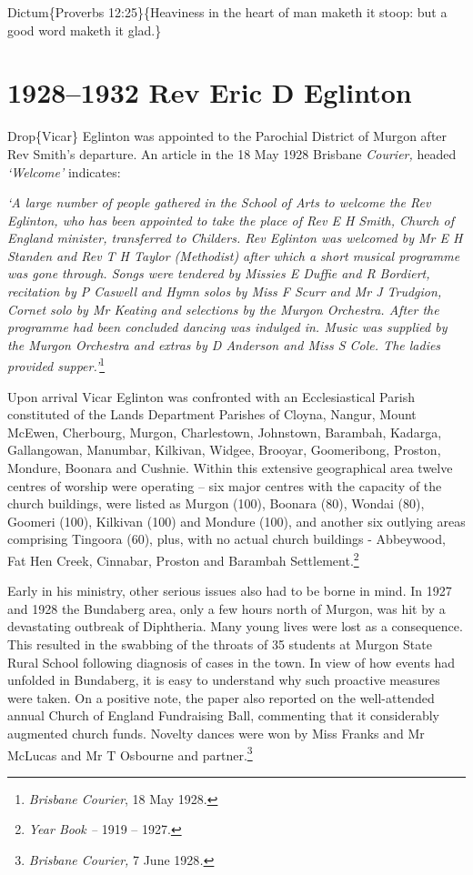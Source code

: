 Dictum\{Proverbs 12:25\}\{Heaviness in the heart of man maketh it stoop: but a good word maketh it glad.\}

\hypertarget{rev-eric-d-eglinton}{%
\chapter{1928--1932 Rev Eric D Eglinton}\label{rev-eric-d-eglinton}}

Drop\{Vicar\} Eglinton was appointed to the Parochial District of Murgon after Rev Smith's departure. An article in the 18 May 1928 Brisbane \emph{Courier,} headed \emph{`Welcome'} indicates:

\emph{`A large number of people gathered in the School of Arts to welcome the Rev Eglinton, who has been appointed to take the place of Rev E H Smith, Church of England minister, transferred to Childers. Rev Eglinton was welcomed by Mr E H Standen and Rev T H Taylor (Methodist) after which a short musical programme was gone through. Songs were tendered by Missies E Duffie and R Bordiert, recitation by P Caswell and Hymn solos by Miss F Scurr and Mr J Trudgion, Cornet solo by Mr Keating and selections by the Murgon Orchestra. After the programme had been concluded dancing was indulged in. Music was supplied by the Murgon Orchestra and extras by D Anderson and Miss S Cole. The ladies provided supper.'}\footnote{\emph{Brisbane Courier}, 18 May 1928.}

Upon arrival Vicar Eglinton was confronted with an Ecclesiastical Parish constituted of the Lands Department Parishes of Cloyna, Nangur, Mount McEwen, Cherbourg, Murgon, Charlestown, Johnstown, Barambah, Kadarga, Gallangowan, Manumbar, Kilkivan, Widgee, Brooyar, Goomeribong, Proston, Mondure, Boonara and Cushnie. Within this extensive geographical area twelve centres of worship were operating -- six major centres with the capacity of the church buildings, were listed as Murgon (100), Boonara (80), Wondai (80), Goomeri (100), Kilkivan (100) and Mondure (100), and another six outlying areas comprising Tingoora (60), plus, with no actual church buildings - Abbeywood, Fat Hen Creek, Cinnabar, Proston and Barambah Settlement.\footnote{\emph{Year Book --} 1919 -- 1927.}

Early in his ministry, other serious issues also had to be borne in mind. In 1927 and 1928 the Bundaberg area, only a few hours north of Murgon, was hit by a devastating outbreak of Diphtheria. Many young lives were lost as a consequence. This resulted in the swabbing of the throats of 35 students at Murgon State Rural School following diagnosis of cases in the town. In view of how events had unfolded in Bundaberg, it is easy to understand why such proactive measures were taken. On a positive note, the paper also reported on the well-attended annual Church of England Fundraising Ball, commenting that it considerably augmented church funds. Novelty dances were won by Miss Franks and Mr McLucas and Mr T Osbourne and partner.\footnote{\emph{Brisbane Courier,} 7 June 1928\emph{.}}

